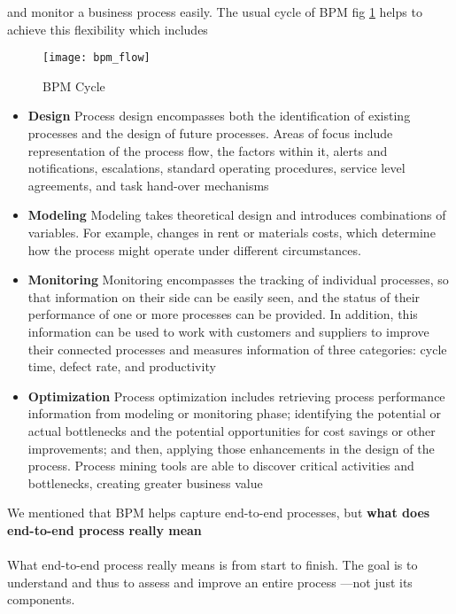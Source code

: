 and monitor a business process easily. The usual cycle of BPM fig \ref{fig:bpm_flow} helps to achieve this
flexibility which includes
\begin{figure}[h]
    \texttt{[image: bpm\_flow]}
    \centering
    \caption{BPM Cycle}
    \label{fig:bpm_flow}
\end{figure}
\begin{itemize}
    \item \textbf{Design} Process design encompasses both the identification of existing processes and the
    design of future processes. Areas of focus include representation of the process flow, the
    factors within it, alerts and notifications, escalations, standard operating procedures, service
    level agreements, and task hand-over mechanisms
    \item \textbf{Modeling} Modeling takes theoretical design and introduces combinations of variables. For
    example, changes in rent or materials costs, which determine how the process might operate
    under different circumstances.
    \item \textbf{Monitoring} Monitoring encompasses the tracking of individual processes, so that
    information on their side can be easily seen, and the status of their performance of one or
    more processes can be provided. In addition, this information can be used to work with
    customers and suppliers to improve their connected processes and measures information of
    three categories: cycle time, defect rate, and productivity
    \item \textbf{Optimization} Process optimization includes retrieving process performance information
    from modeling or monitoring phase; identifying the potential or actual bottlenecks and the
    potential opportunities for cost savings or other improvements; and then, applying those
    enhancements in the design of the process. Process mining tools are able to discover critical
    activities and bottlenecks, creating greater business value
    
\end{itemize}



We mentioned that BPM helps capture end-to-end processes, but \textbf{what does end-to-end process really
mean}\\\\
What end-to-end process really means is from start to finish. The goal is to understand and thus to assess and improve an entire process —not just its components.
\\

